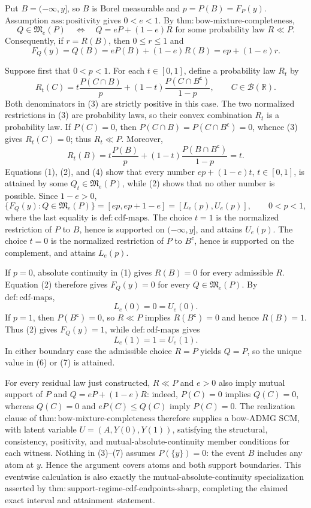 Put \(B=({-}\infty,y]\), so \(B\) is Borel measurable and \(p=P(B)=F_P(y)\).  Assumption \(\mathrm{ass:positivity}\) gives \(0<e<1\).  By \(\mathrm{thm:bow\text{-}mixture\text{-}completeness}\),
\[
 Q\in\mathfrak M_e(P)
 \quad\Longleftrightarrow\quad
 Q=eP+(1-e)R
 \text{ for some probability law }R\ll P. \tag{1}
\]
Consequently, if \(r=R(B)\), then \(0\le r\le1\) and
\[
 F_Q(y)=Q(B)=eP(B)+(1-e)R(B)=ep+(1-e)r. \tag{2}
\]

Suppose first that \(0<p<1\).  For each \(t\in[0,1]\), define a probability law \(R_t\) by
\[
 R_t(C)
 =t\frac{P(C\cap B)}{p}
 +(1-t)\frac{P(C\cap B^{\mathsf c})}{1-p},
 \qquad C\in\mathcal B(\mathbb R). \tag{3}
\]
Both denominators in (3) are strictly positive in this case.  The two normalized restrictions in (3) are probability laws, so their convex combination \(R_t\) is a probability law.  If \(P(C)=0\), then \(P(C\cap B)=P(C\cap B^{\mathsf c})=0\), whence (3) gives \(R_t(C)=0\); thus \(R_t\ll P\).  Moreover,
\[
 R_t(B)
 =t\frac{P(B)}{p}
 +(1-t)\frac{P(B\cap B^{\mathsf c})}{1-p}
 =t. \tag{4}
\]
Equations (1), (2), and (4) show that every number \(ep+(1-e)t\), \(t\in[0,1]\), is attained by some \(Q_t\in\mathfrak M_e(P)\), while (2) shows that no other number is possible.  Since \(1-e>0\),
\[
 \{F_Q(y):Q\in\mathfrak M_e(P)\}
 =[ep,ep+1-e]
 =[L_e(p),U_e(p)], \qquad 0<p<1, \tag{5}
\]
where the last equality is \(\mathrm{def:cdf\text{-}maps}\).  The choice \(t=1\) is the normalized restriction of \(P\) to \(B\), hence is supported on \(({-}\infty,y]\), and attains \(U_e(p)\).  The choice \(t=0\) is the normalized restriction of \(P\) to \(B^{\mathsf c}\), hence is supported on the complement, and attains \(L_e(p)\).

If \(p=0\), absolute continuity in (1) gives \(R(B)=0\) for every admissible \(R\).  Equation (2) therefore gives \(F_Q(y)=0\) for every \(Q\in\mathfrak M_e(P)\).  By \(\mathrm{def:cdf\text{-}maps}\),
\[
 L_e(0)=0=U_e(0). \tag{6}
\]
If \(p=1\), then \(P(B^{\mathsf c})=0\), so \(R\ll P\) implies \(R(B^{\mathsf c})=0\) and hence \(R(B)=1\).  Thus (2) gives \(F_Q(y)=1\), while \(\mathrm{def:cdf\text{-}maps}\) gives
\[
 L_e(1)=1=U_e(1). \tag{7}
\]
In either boundary case the admissible choice \(R=P\) yields \(Q=P\), so the unique value in (6) or (7) is attained.

For every residual law just constructed, \(R\ll P\) and \(e>0\) also imply mutual support of \(P\) and \(Q=eP+(1-e)R\): indeed, \(P(C)=0\) implies \(Q(C)=0\), whereas \(Q(C)=0\) and \(eP(C)\le Q(C)\) imply \(P(C)=0\).  The realization clause of \(\mathrm{thm:bow\text{-}mixture\text{-}completeness}\) therefore supplies a bow-ADMG SCM, with latent variable \(U=(A,Y(0),Y(1))\), satisfying the structural, consistency, positivity, and mutual-absolute-continuity member conditions for each witness.  Nothing in (3)--(7) assumes \(P(\{y\})=0\): the event \(B\) includes any atom at \(y\).  Hence the argument covers atoms and both support boundaries.  This eventwise calculation is also exactly the mutual-absolute-continuity specialization asserted by \(\mathrm{thm:support\text{-}regime\text{-}cdf\text{-}endpoints\text{-}sharp}\), completing the claimed exact interval and attainment statement.